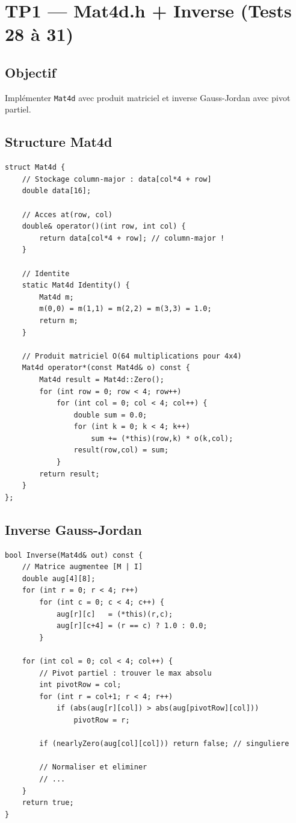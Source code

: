 \documentclass[12pt,a4paper]{report}
\begin{document}
\section{TP1 --- Mat4d.h + Inverse (Tests 28 à 31)}

\subsection{Objectif}

Implémenter \texttt{Mat4d} avec produit matriciel et inverse
Gauss-Jordan avec pivot partiel.

\subsection{Structure Mat4d}

\begin{lstlisting}[caption={Mat4d.h --- structure column-major}]
struct Mat4d {
    // Stockage column-major : data[col*4 + row]
    double data[16];

    // Acces at(row, col)
    double& operator()(int row, int col) {
        return data[col*4 + row]; // column-major !
    }

    // Identite
    static Mat4d Identity() {
        Mat4d m;
        m(0,0) = m(1,1) = m(2,2) = m(3,3) = 1.0;
        return m;
    }

    // Produit matriciel O(64 multiplications pour 4x4)
    Mat4d operator*(const Mat4d& o) const {
        Mat4d result = Mat4d::Zero();
        for (int row = 0; row < 4; row++)
            for (int col = 0; col < 4; col++) {
                double sum = 0.0;
                for (int k = 0; k < 4; k++)
                    sum += (*this)(row,k) * o(k,col);
                result(row,col) = sum;
            }
        return result;
    }
};
\end{lstlisting}

\subsection{Inverse Gauss-Jordan}

\begin{lstlisting}[caption={Mat4d --- Inverse Gauss-Jordan}]
bool Inverse(Mat4d& out) const {
    // Matrice augmentee [M | I]
    double aug[4][8];
    for (int r = 0; r < 4; r++)
        for (int c = 0; c < 4; c++) {
            aug[r][c]   = (*this)(r,c);
            aug[r][c+4] = (r == c) ? 1.0 : 0.0;
        }

    for (int col = 0; col < 4; col++) {
        // Pivot partiel : trouver le max absolu
        int pivotRow = col;
        for (int r = col+1; r < 4; r++)
            if (abs(aug[r][col]) > abs(aug[pivotRow][col]))
                pivotRow = r;

        if (nearlyZero(aug[col][col])) return false; // singuliere

        // Normaliser et eliminer
        // ...
    }
    return true;
}
\end{lstlisting}
\end{document}
